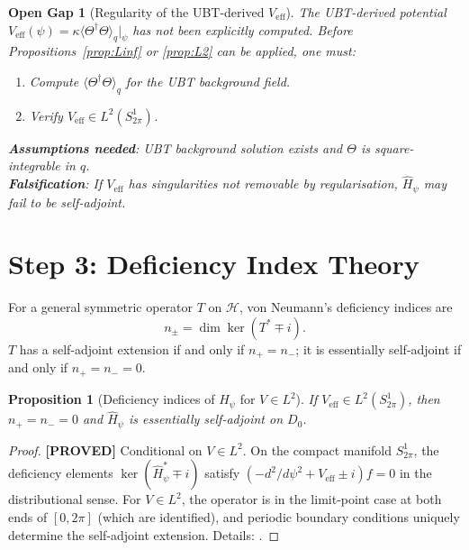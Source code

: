 \documentclass[11pt,a4paper]{article}
\newtheorem{proposition}{Proposition}
\newtheorem{gap}{Open Gap}
\newcommand{\proved}[1]{\textbf{[PROVED]} #1}
\begin{document}
\begin{gap}[Regularity of the UBT-derived $V_\mathrm{eff}$]
  \label{gap:Vreg}
  The UBT-derived potential $V_\mathrm{eff}(\psi) = \kappa\langle\Theta^\dagger\Theta\rangle_q|_\psi$
  has not been explicitly computed.  Before Propositions~\ref{prop:Linf} or
  \ref{prop:L2} can be applied, one must:
  \begin{enumerate}
    \item Compute $\langle\Theta^\dagger\Theta\rangle_q$ for the UBT background field.
    \item Verify $V_\mathrm{eff} \in L^2(S^1_{2\pi})$.
  \end{enumerate}
  \textbf{Assumptions needed}: UBT background solution exists and $\Theta$ is
  square-integrable in $q$.\\
  \textbf{Falsification}: If $V_\mathrm{eff}$ has singularities not removable
  by regularisation, $\hat{H}_\psi$ may fail to be self-adjoint.
\end{gap}

\section{Step 3: Deficiency Index Theory}

For a general symmetric operator $T$ on $\mathscr{H}$, von Neumann's deficiency
indices are
\[
  n_\pm = \dim\ker(T^* \mp i).
\]
$T$ has a self-adjoint extension if and only if $n_+ = n_-$; it is essentially
self-adjoint if and only if $n_+ = n_- = 0$.

\begin{proposition}[Deficiency indices of $\hat{H}_\psi$ for $V \in L^2$]
  If $V_\mathrm{eff} \in L^2(S^1_{2\pi})$, then $n_+ = n_- = 0$ and
  $\hat{H}_\psi$ is essentially self-adjoint on $D_0$.
\end{proposition}

\begin{proof}
  \proved{Conditional on $V \in L^2$.}  On the compact manifold $S^1_{2\pi}$,
  the deficiency elements $\ker(\hat{H}_\psi^* \mp i)$ satisfy
  $(-d^2/d\psi^2 + V_\mathrm{eff} \pm i)f = 0$ in the distributional sense.
  For $V \in L^2$, the operator is in the limit-point case at both ends of
  $[0,2\pi]$ (which are identified), and periodic boundary conditions uniquely
  determine the self-adjoint extension.  Details: \cite[§X.1]{ReedSimon2}.
\end{proof}
\end{document}
